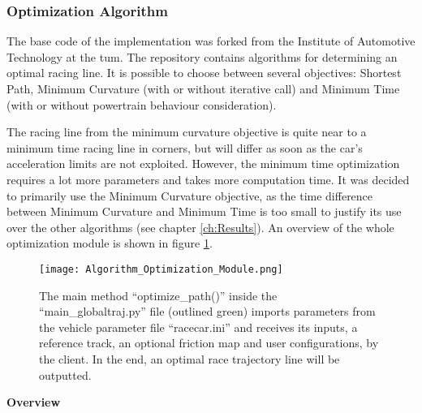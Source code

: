 \subsubsection{Optimization Algorithm} \label{sec:Optimization Algorithm}
The base code of the implementation was forked from the Institute of Automotive Technology at the \acrlong{tum}.
The repository contains algorithms for determining an optimal racing line. It is possible to choose between several objectives: Shortest Path, Minimum Curvature (with or without iterative call) and Minimum Time (with or without powertrain behaviour consideration). \cite{tumftm_optimization_algoritm}

The racing line from the minimum curvature objective is quite near to a minimum time racing line in corners, but will differ as soon as the car's acceleration limits are not exploited. However, the minimum time optimization requires a lot more parameters and takes more computation time. It was decided to primarily use the Minimum Curvature objective, as the time difference between Minimum Curvature and Minimum Time is too small to justify its use over the other algorithms (see chapter \ref{ch:Results}). An overview of the whole optimization module is shown in figure \ref{fig:Optimization Algorithm Module Overview}.
\begin{figure}[H]
    \centering
    \texttt{[image: Algorithm\_Optimization\_Module.png]}
    \caption{The main method ``optimize\_path()'' inside the ``main\_globaltraj.py'' file (outlined green) imports parameters from the vehicle parameter file ``racecar.ini'' and receives its inputs, a reference track, an optional friction map and user configurations, by the client. In the end, an optimal race trajectory line will be outputted.}
    \label{fig:Optimization Algorithm Module Overview}
\end{figure}

\textbf{Overview}

